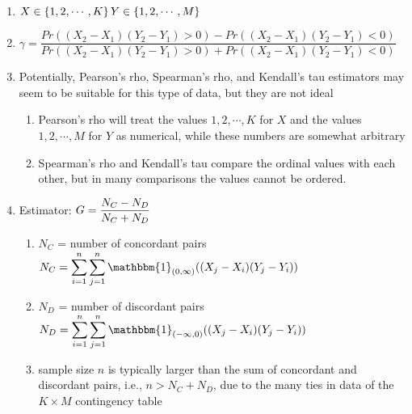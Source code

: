 \begin{enumerate}
    \item[] $
        \hfill
        X \in \dCurlyBrac{1, 2,\cdots, K}
        \hfill
        Y \in \dCurlyBrac{1, 2,\cdots, M}
        \hfill
    $

    \vspace{0.2cm}
    \item[] $
        \gamma
        = \dfrac{
            Pr((X_2 - X_1)(Y_2 - Y_1) > 0) - Pr((X_2 - X_1)(Y_2 - Y_1) < 0)
        }{
            Pr((X_2 - X_1)(Y_2 - Y_1) > 0) + Pr((X_2 - X_1)(Y_2 - Y_1) < 0)
        }
    $

    \vspace{0.2cm}
    \item Potentially, Pearson’s rho, Spearman’s rho, and Kendall’s tau estimators may seem to be suitable for this type of data, but they are not ideal

    \begin{enumerate}
        \item Pearson’s rho will treat the values $1, 2, \cdots, K$ for $X$ and the values $1, 2, \cdots, M$ for $Y$ as numerical, while these numbers are somewhat arbitrary

        \item Spearman’s rho and Kendall’s tau compare the ordinal values with each other, but in many comparisons the values cannot be ordered.
    \end{enumerate}

    \item Estimator: $
        \hfill
        G = \dfrac{N_C - N_D}{N_C + N_D}
        \hfill
    $

    \begin{enumerate}
        \item $N_C$ 
        = number of concordant pairs 
        \hfill
        $
            N_C
            =\dsum_{i=1}^n \dsum_{j=1}^n
            \mathbbm{1}_{(0,\infty)} ((X_j - X_i)(Y_j - Y_i))
        $
        \hfill
    
        \item $N_D$ 
        = number of discordant pairs 
        \hfill
        $
            N_D
            =\dsum_{i=1}^n \dsum_{j=1}^n
            \mathbbm{1}_{(-\infty,0)} ((X_j - X_i)(Y_j - Y_i))
        $
        \hfill
    
        \item sample size $n$ is typically larger than the sum of concordant and discordant pairs, i.e., $n > N_C + N_D$, due to the many ties in data of the $K \times M$ contingency table
    \end{enumerate}


\end{enumerate}
